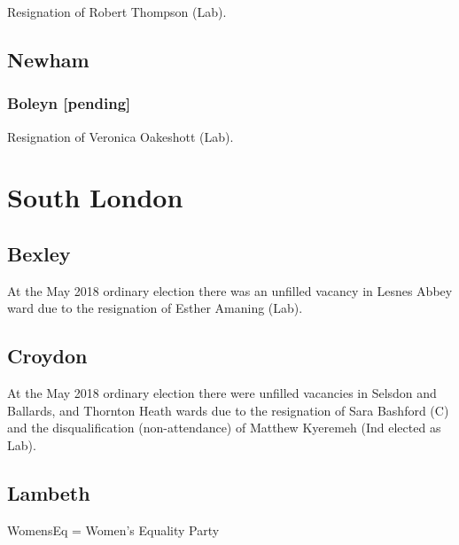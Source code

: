 \documentclass[a4paper,openany]{book}
\begin{document}
\begin{resultsiii}

Resignation of Robert Thompson (Lab).

\subsection*{Newham}

\subsubsection*{Boleyn
	\hspace*{\fill}\nolinebreak[1]%
	\enspace\hspace*{\fill}
	[pending]}


Resignation of Veronica Oakeshott (Lab).

\section{South London}

\subsection*{Bexley}

At the May 2018 ordinary election there was an unfilled vacancy in Lesnes Abbey ward due to the resignation of Esther Amaning (Lab).

\subsection*{Croydon}

At the May 2018 ordinary election there were unfilled vacancies in Selsdon and Ballards, and Thornton Heath wards due to the resignation of Sara Bashford (C) and the disqualification (non-attendance) of Matthew Kyeremeh (Ind elected as Lab).

\subsection*{Lambeth}

WomensEq = Women's Equality Party


\end{resultsiii}
\end{document}
